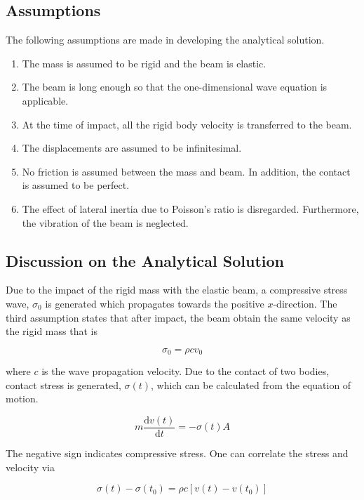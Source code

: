\documentclass{article}
\begin{document}
\subsection{Assumptions}
The following assumptions are made in developing the analytical solution.

\begin{enumerate}
    \item The mass is assumed to be rigid and the beam is elastic.
    \item The beam is long enough so that the one-dimensional wave equation is applicable.
    \item At the time of impact, all the rigid body velocity is transferred to the beam.
    \item The displacements are assumed to be infinitesimal.
    \item No friction is assumed between the mass and beam. In addition, the contact is assumed to be perfect.
    \item The effect of lateral inertia due to Poisson's ratio is disregarded. Furthermore, the vibration of the beam is neglected.
\end{enumerate}

\subsection{Discussion on the Analytical Solution}\label{sec:analytic_sol}
Due to the impact of the rigid mass with the elastic beam, a compressive stress wave, $\sigma_0$ is generated which propagates towards the positive $x$-direction. The third assumption states that after impact, the beam obtain the same velocity as the rigid mass that is

\begin{equation}
    \sigma_0 = \rho c v_0
    \label{eq:sigma_0}
\end{equation}

where $c$ is the wave propagation velocity. Due to the contact of two bodies, contact stress is generated, $\sigma(t)$, which can be calculated from the equation of motion.

\begin{equation}
    m\frac{\text{d} v(t)}{\text{d} t} = -\sigma(t) A
    \label{eq:eom}
\end{equation}

The negative sign indicates compressive stress. One can correlate the stress and velocity via

\begin{equation}
    \sigma(t) - \sigma(t_0) = \rho c [v(t) - v(t_0)]
    \label{eq:stress_wave}
\end{equation}
\end{document}
